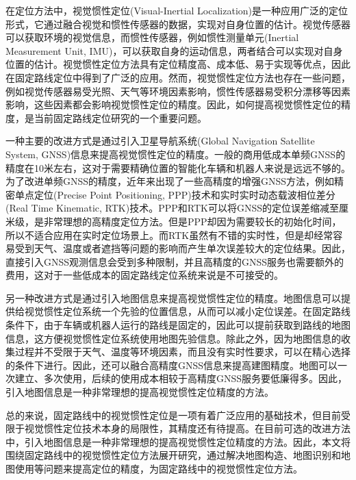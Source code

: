 在定位方法中，视觉惯性定位(Visual-Inertial Localization)是一种应用广泛的定位形式，它通过融合视觉和惯性传感器的数据，实现对自身位置的估计。视觉传感器可以获取环境的视觉信息，而惯性传感器，例如惯性测量单元(Inertial Measurement Unit, IMU)，可以获取自身的运动信息，两者结合可以实现对自身位置的估计。视觉惯性定位方法具有定位精度高、成本低、易于实现等优点，因此在固定路线定位中得到了广泛的应用。然而，视觉惯性定位方法也存在一些问题，例如视觉传感器易受光照、天气等环境因素影响，惯性传感器易受积分漂移等因素影响，这些因素都会影响视觉惯性定位的精度。因此，如何提高视觉惯性定位的精度，是当前固定路线定位研究的一个重要问题。

一种主要的改进方式是通过引入卫星导航系统(Global Navigation Satellite System, GNSS)信息来提高视觉惯性定位的精度。一般的商用低成本单频GNSS的精度在10米左右，这对于需要精确位置的智能化车辆和机器人来说是远远不够的。为了改进单频GNSS的精度，近年来出现了一些高精度的增强GNSS方法，例如精密单点定位(Precise Point Positioning, PPP)\cite{zumberge1997precise}技术和实时实时动态载波相位差分(Real Time Kinematic, RTK)\cite{fotopoulos2001overview}技术。PPP和RTK可以将GNSS的定位误差缩减至厘米级，是非常理想的高精度定位方法。但是PPP却因为需要较长的初始化时间\cite{bisnath2018innovation}，所以不适合应用在实时定位场景上。而RTK虽然有不错的实时性，但是却经常容易受到天气、温度或者遮挡等问题的影响而产生单次误差较大的定位结果\cite{li2022review}。因此，直接引入GNSS观测信息会受到多种限制，并且高精度的GNSS服务也需要额外的费用，这对于一些低成本的固定路线定位系统来说是不可接受的。

另一种改进方式是通过引入地图信息来提高视觉惯性定位的精度。地图信息可以提供给视觉惯性定位系统一个先验的位置信息，从而可以减小定位误差。在固定路线条件下，由于车辆或机器人运行的路线是固定的，因此可以提前获取到路线的地图信息，这方便视觉惯性定位系统使用地图先验信息。除此之外，因为地图信息的收集过程并不受限于天气、温度等环境因素，而且没有实时性要求，可以在精心选择的条件下进行。因此，还可以融合高精度GNSS信息来提高建图精度。地图可以一次建立、多次使用，后续的使用成本相较于高精度GNSS服务要低廉得多。因此，引入地图信息是一种非常理想的提高视觉惯性定位精度的方法。

总的来说，固定路线中的视觉惯性定位是一项有着广泛应用的基础技术，但目前受限于视觉惯性定位技术本身的局限性，其精度还有待提高。在目前可选的改进方法中，引入地图信息是一种非常理想的提高视觉惯性定位精度的方法。因此，本文将围绕固定路线中的视觉惯性定位方法展开研究，通过解决地图构造、地图识别和地图使用等问题来提高定位的精度，为固定路线中的视觉惯性定位方法。



